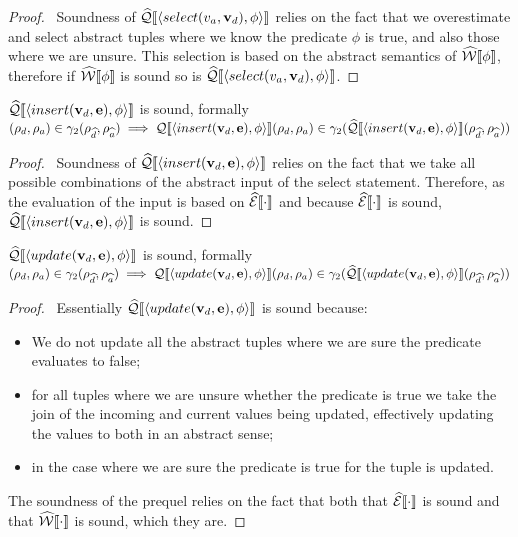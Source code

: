 \begin{proof}
    \pfsketch\
    Soundness of $\widehat{\mathcal{Q}}\llbracket \langle select(v_a, \mathbf{v}_d), \phi \rangle \rrbracket$ relies on the fact that we overestimate and select abstract tuples where we know the predicate $\phi$ is true, and also those where we are unsure.
    This selection is based on the abstract semantics of $\widehat{\mathcal{W}}\llbracket \phi \rrbracket$, therefore if $\widehat{\mathcal{W}}\llbracket \phi \rrbracket$ is sound so is $\widehat{\mathcal{Q}}\llbracket \langle select(v_a, \mathbf{v}_d), \phi \rangle \rrbracket$.
\end{proof}


\begin{conjecture}\label{thm:sound-insert}
    $\widehat{\mathcal{Q}}\llbracket \langle insert(\mathbf{v}_d, \mathbf{e}), \phi \rangle \rrbracket$ is sound, formally $(\rho_d, \rho_a) \in \gamma_2(\rho_{\widehat{d}}, \rho_{\widehat{a}}) \implies \mathcal{Q}\llbracket \langle insert(\mathbf{v}_d, \mathbf{e}), \phi \rangle \rrbracket(\rho_d, \rho_a) \in \gamma_2(\widehat{\mathcal{Q}}\llbracket \langle insert(\mathbf{v}_d, \mathbf{e}), \phi \rangle \rrbracket(\rho_{\widehat{d}}, \rho_{\widehat{a}}))$
\end{conjecture}


\begin{proof}
    \pfsketch\
    Soundness of $\widehat{\mathcal{Q}}\llbracket \langle insert(\mathbf{v}_d, \mathbf{e}), \phi \rangle \rrbracket$ relies on the fact that we take all possible combinations of the abstract input of the select statement.
    Therefore, as the evaluation of the input is based on $\widehat{\mathcal{E}}\llbracket \cdot \rrbracket$ and because $\widehat{\mathcal{E}}\llbracket \cdot \rrbracket$ is sound, $\widehat{\mathcal{Q}}\llbracket \langle insert(\mathbf{v}_d, \mathbf{e}), \phi \rangle \rrbracket$ is sound.
\end{proof}


\begin{conjecture}\label{thm:sound-update}
    $\widehat{\mathcal{Q}}\llbracket \langle update(\mathbf{v}_d, \mathbf{e}), \phi \rangle \rrbracket$ is sound, formally $(\rho_d, \rho_a) \in \gamma_2(\rho_{\widehat{d}}, \rho_{\widehat{a}}) \implies \mathcal{Q}\llbracket \langle update(\mathbf{v}_d, \mathbf{e}), \phi \rangle \rrbracket(\rho_d, \rho_a) \in \gamma_2(\widehat{\mathcal{Q}}\llbracket \langle update(\mathbf{v}_d, \mathbf{e}), \phi \rangle \rrbracket(\rho_{\widehat{d}}, \rho_{\widehat{a}}))$
\end{conjecture}


\begin{proof}
    \pfsketch\
    Essentially $\widehat{\mathcal{Q}}\llbracket \langle update(\mathbf{v}_d, \mathbf{e}), \phi \rangle \rrbracket$ is sound because:
    \begin{itemize}
        \item We do not update all the abstract tuples where we are sure the predicate evaluates to false;
        \item for all tuples where we are unsure whether the predicate is true we take the join of the incoming and current values being updated, effectively updating the values to both in an abstract sense;
        \item in the case where we are sure the predicate is true for the tuple is updated.
    \end{itemize}
    The soundness of the prequel relies on the fact that both that $\widehat{\mathcal{E}}\llbracket \cdot \rrbracket$ is sound and that $\widehat{\mathcal{W}}\llbracket \cdot \rrbracket$ is sound, which they are.
\end{proof}


